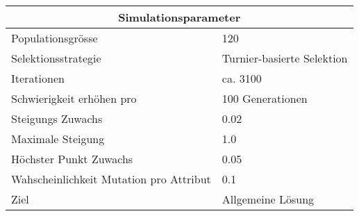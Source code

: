 
    \begin{tabular}{ | l | l | }
      \hline
      \multicolumn{2}{|c|}{Simulationsparameter} \\
      \hline
      Populationsgrösse & 120 \\ \hline
      Selektionsstrategie & Turnier-basierte Selektion \\ \hline
      Iterationen & ca. 3100 \\ \hline
      Schwierigkeit erhöhen pro & 100 Generationen \\ \hline
      Steigungs Zuwachs & 0.02 \\ \hline
      Maximale Steigung & 1.0 \\ \hline
      Höchster Punkt Zuwachs & 0.05 \\ \hline
      Wahscheinlichkeit Mutation pro Attribut & 0.1 \\ \hline
      Ziel & Allgemeine Lösung \\ \hline
    \end{tabular}
